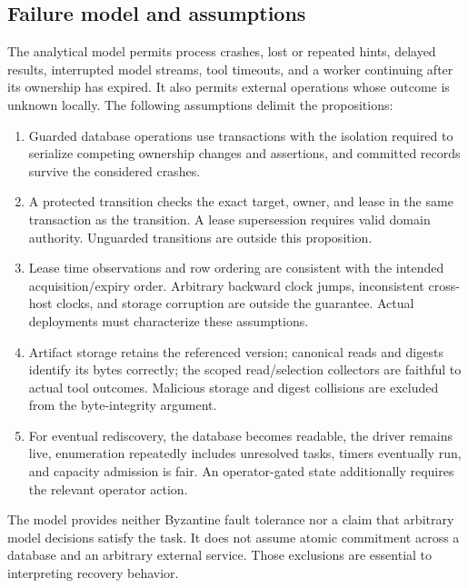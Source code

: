 \subsection{Failure model and assumptions}\label{sec:assumptions}
The analytical model permits process crashes, lost or repeated hints, delayed results, interrupted model streams, tool timeouts, and a worker continuing after its ownership has expired. It also permits external operations whose outcome is unknown locally. The following assumptions delimit the propositions:
\begin{enumerate}[label=A\arabic*.]
\item Guarded database operations use transactions with the isolation required to serialize competing ownership changes and assertions, and committed records survive the considered crashes.
\item A protected transition checks the exact target, owner, and lease in the same transaction as the transition. A lease supersession requires valid domain authority. Unguarded transitions are outside this proposition.
\item Lease time observations and row ordering are consistent with the intended acquisition/expiry order. Arbitrary backward clock jumps, inconsistent cross-host clocks, and storage corruption are outside the guarantee. Actual deployments must characterize these assumptions.
\item Artifact storage retains the referenced version; canonical reads and digests identify its bytes correctly; the scoped read/selection collectors are faithful to actual tool outcomes. Malicious storage and digest collisions are excluded from the byte-integrity argument.
\item For eventual rediscovery, the database becomes readable, the driver remains live, enumeration repeatedly includes unresolved tasks, timers eventually run, and capacity admission is fair. An operator-gated state additionally requires the relevant operator action.
\end{enumerate}
The model provides neither Byzantine fault tolerance nor a claim that arbitrary model decisions satisfy the task. It does not assume atomic commitment across a database and an arbitrary external service. Those exclusions are essential to interpreting recovery behavior.
